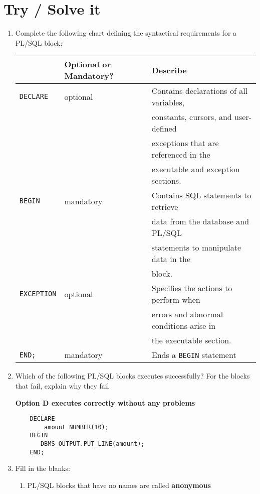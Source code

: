 \documentclass[11pt]{article}
\begin{document}
\section{Try / Solve it}
\label{sec:org113d4ae}
\begin{enumerate}
\item Complete the following chart defining the syntactical requirements for a
PL/SQL block:
\begin{center}
\begin{tabular}{lll}
 & Optional or Mandatory? & Describe\\[0pt]
\hline
\texttt{DECLARE} & optional & Contains declarations of all variables,\\[0pt]
 &  & constants, cursors, and user-defined\\[0pt]
 &  & exceptions that are referenced in the\\[0pt]
 &  & executable and exception sections.\\[0pt]
\texttt{BEGIN} & mandatory & Contains SQL statements to retrieve\\[0pt]
 &  & data from the database and PL/SQL\\[0pt]
 &  & statements to manipulate data in the\\[0pt]
 &  & block.\\[0pt]
\texttt{EXCEPTION} & optional & Specifies the actions to perform when\\[0pt]
 &  & errors and abnormal conditions arise in\\[0pt]
 &  & the executable section.\\[0pt]
\texttt{END;} & mandatory & Ends a \texttt{BEGIN} statement\\[0pt]
\end{tabular}
\end{center}

\item Which of the following PL/SQL blocks executes successfully? For the blocks
that fail, explain why they fail

\textbf{Option D executes correctly without any problems}

\begin{verbatim}
    DECLARE
        amount NUMBER(10);
    BEGIN
       DBMS_OUTPUT.PUT_LINE(amount);
    END;
\end{verbatim}

\item Fill in the blanks:

\begin{enumerate}
\item PL/SQL blocks that have no names are called \textbf{anonymous}


\end{enumerate}
\end{enumerate}
\end{document}
